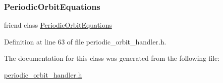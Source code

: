 \subsubsection{\texorpdfstring{Periodic\+Orbit\+Equations}{PeriodicOrbitEquations}}
{\footnotesize\ttfamily friend class \hyperlink{classoomph_1_1PeriodicOrbitEquations}{Periodic\+Orbit\+Equations}\hspace{0.3cm}{\ttfamily [friend]}}



Definition at line 63 of file periodic\+\_\+orbit\+\_\+handler.\+h.



The documentation for this class was generated from the following file\+:\begin{DoxyCompactItemize}
\item 
\hyperlink{periodic__orbit__handler_8h}{periodic\+\_\+orbit\+\_\+handler.\+h}\end{DoxyCompactItemize}
